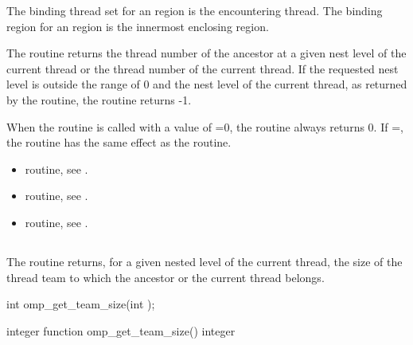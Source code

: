\binding
The binding thread set for an  region is the
encountering thread. The binding region for an 
region is the innermost enclosing  region.

\effect
The  routine returns the thread number 
of the ancestor at a given nest level of the current thread or the thread 
number of the current thread. If the requested nest level is outside the 
range of 0 and the nest level of the current thread, as returned by the 
 routine, the routine returns -1.

\begin{note}
When the  routine is called with a value
of =0, the routine always returns 0. If 
=, the routine has the same effect as 
the  routine.
\end{note}

\crossreferences
\begin{itemize}
\item {} routine, see
.

\item {} routine, see
.

\item {} routine, see
.
\end{itemize}



\subsection{}
\label{subsec:omp_get_team_size}
\summary
The  routine returns, for a given nested 
level of the current thread, the size of the thread team to which 
the ancestor or the current thread belongs.

\format
\begin{ccppspecific}
\begin{ompcFunction}
int omp_get_team_size(int );
\end{ompcFunction}
\end{ccppspecific}

\begin{fortranspecific}
\begin{ompfFunction}
integer function omp_get_team_size()
integer 
\end{ompfFunction}
\end{fortranspecific}

